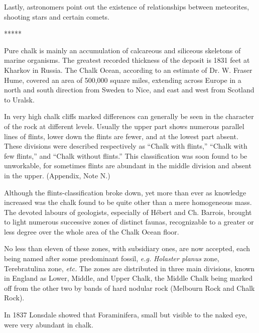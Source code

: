 \documentclass[a4paper, 12pt, oneside]{article}
\begin{document}
Lastly, astronomers point out the existence of relationships between meteorites, shooting stars and certain comets.

\centerline{*\hspace{15mm}*\hspace{15mm}*\hspace{15mm}*\hspace{15mm}*}
\bigskip

Pure chalk is mainly an accumulation of calcareous and siliceous skeletons of marine organisms. The greatest recorded thickness of the deposit is 1831 feet at Kharkov in Russia. The Chalk Ocean, according to an estimate of Dr. W. Fraser Hume, covered an area of 500,000 square miles, extending across Europe in a north and south direction from Sweden to Nice, and east and west from Scotland to Uralsk.

In very high chalk cliffs marked differences can generally be seen in the character of the rock at different levels. Usually the upper part shows numerous parallel lines of flints, lower down the flints are fewer, and at the lowest part absent. These divisions were described respectively as ``Chalk with flints,'' ``Chalk with few flints,'' and ``Chalk without flints.'' This classification was soon found to be unworkable, for sometimes flints are abundant in the middle division and absent in the upper. (Appendix, Note N.)

Although the flints-classification broke down, yet more than ever as knowledge increased was the chalk found to be quite other than a mere homogeneous mass. The devoted labours of geologists, especially of Hébert and Ch. Barrois, brought to light numerous successive zones of distinct faunas, recognizable to a greater or less degree over the whole area of the Chalk Ocean floor.

No less than eleven of these zones, with subsidiary ones, are now accepted, each being named after some predominant fossil, \emph{e.g.} \emph{Holaster planus} zone, Terebratulina zone, \emph{etc.} The zones are distributed in three main divisions, known in England as Lower, Middle, and Upper Chalk, the Middle Chalk being marked off from the other two by bands of hard nodular rock (Melbourn Rock and Chalk Rock).

In 1837 Lonsdale showed that Foraminifera, small but visible to the naked eye, were very abundant in chalk.
\end{document}
